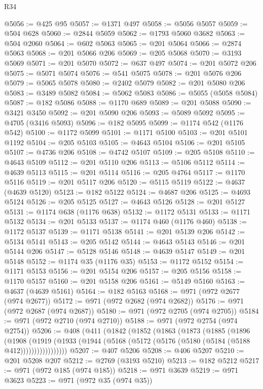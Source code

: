 \begin{lexlean}{R34}
\begin{coremodule}
@5056 := @425 @95
@5057 := @1371 @497
@5058 := @5056 @5057
@5059 := @504 @628
@5060 := @2844 @5059
@5062 := @1793 @5060 @3682
@5063 := @504 @2060
@5064 := @602 @5063
@5065 := @201 @5064
@5066 := @2874 @5063
@5068 := @201 @5066 @206
@5069 := @205 @5068
@5070 := @3193 @5069
@5071 := @201 @5070
@5072 := @637 @497
@5074 := @201 @5072 @206
@5075 := @5071 @5074
@5076 := @541 @5075
@5078 := @201 @5076 @206
@5079 := @5065 @5078
@5080 := @2402 @5079
@5082 := @201 @5080 @206
@5083 := @3489 @5082
@5084 := @5062 @5083
@5086 := @5055 (@5058 @5084)
@5087 := @182 @5086
@5088 := @1170 @689
@5089 := @201 @5088
@5090 := @3421 @3450
@5092 := @201 @5090 @206
@5093 := @5089 @5092
@5095 := @4705 (@3416 @5093)
@5096 := @182 @5095
@5099 := @1174 @542 (@1176 @542)
@5100 := @1172 @5099
@5101 := @1171 @5100
@5103 := @201 @5101 @1192
@5104 := @205 @5103
@5105 := @4643 @5104
@5106 := @201 @5105
@5107 := @4736 @206
@5108 := @4742 @5107
@5109 := @205 @5108
@5110 := @4643 @5109
@5112 := @201 @5110 @206
@5113 := @5106 @5112
@5114 := @4639 @5113
@5115 := @201 @5114
@5116 := @205 @4764
@5117 := @1170 @5116
@5119 := @201 @5117 @206
@5120 := @5115 @5119
@5122 := @4637 (@4639 @5120)
@5123 := @182 @5122
@5124 := @4687 @206
@5125 := @4693 @5124
@5126 := @205 @5125
@5127 := @4643 @5126
@5128 := @201 @5127
@5131 := @1174 @638 (@1176 @638)
@5132 := @1172 @5131
@5133 := @1171 @5132
@5134 := @201 @5133
@5137 := @1174 @460 (@1176 @460)
@5138 := @1172 @5137
@5139 := @1171 @5138
@5141 := @201 @5139 @206
@5142 := @5134 @5141
@5143 := @205 @5142
@5144 := @4643 @5143
@5146 := @201 @5144 @206
@5147 := @5128 @5146
@5148 := @4639 @5147
@5149 := @201 @5148
@5152 := @1174 @35 (@1176 @35)
@5153 := @1172 @5152
@5154 := @1171 @5153
@5156 := @201 @5154 @206
@5157 := @205 @5156
@5158 := @1170 @5157
@5160 := @201 @5158 @206
@5161 := @5149 @5160
@5163 := @4637 (@4639 @5161)
@5164 := @182 @5163
@5168 := @971 (@972 @2677 (@974 @2677))
@5172 := @971 (@972 @2682 (@974 @2682))
@5176 := @971 (@972 @2687 (@974 @2687))
@5180 := @971 (@972 @2705 (@974 @2705))
@5184 := @971 (@972 @2710 (@974 @2710))
@5188 := @971 (@972 @2754 (@974 @2754))
@5206 := @408
    (@411
      (@1842
        (@1852
          (@1863
            (@1873
              (@1885
                (@1896
                  (@1908
                    (@1919
                      (@1933 (@1944 (@5168 (@5172 (@5176 (@5180 (@5184 (@5188 @412)))))))))))))))))
@5207 := @407 @5206
@5208 := @406 @5207
@5210 := @201 @5208 @207
@5212 := @2769 (@3193 @5210)
@5213 := @182 @5212
@5217 := @971 (@972 @185 (@974 @185))
@5218 := @971 @3639
@5219 := @971 @3623
@5223 := @971 (@972 @35 (@974 @35))

\end{coremodule}
\end{lexlean}
